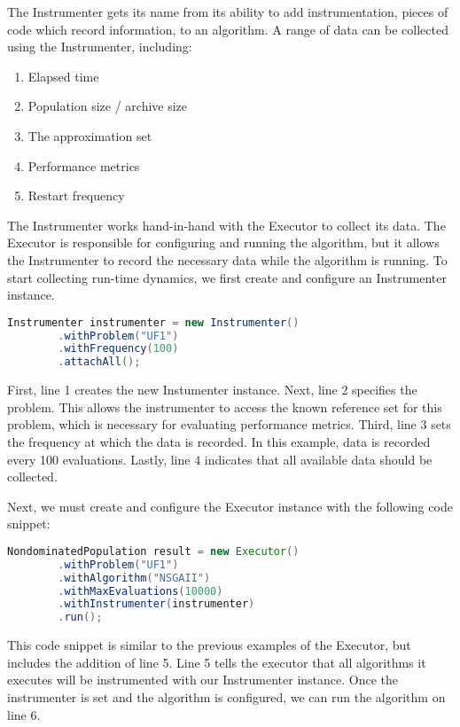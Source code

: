 The Instrumenter gets its name from its ability to add instrumentation, pieces of code which record information, to an algorithm.  A range of data can be collected using the Instrumenter, including:

\begin{enumerate}
  \item Elapsed time
  \item Population size / archive size
  \item The approximation set
  \item Performance metrics
  \item Restart frequency
\end{enumerate}

The Instrumenter works hand-in-hand with the Executor to collect its data.  The Executor is responsible for configuring and running the algorithm, but it allows the Instrumenter to record the necessary data while the algorithm is running.  To start collecting run-time dynamics, we first create and configure an Instrumenter instance.

\begin{lstlisting}[language=Java]
Instrumenter instrumenter = new Instrumenter()
		.withProblem("UF1")
		.withFrequency(100)
		.attachAll();
\end{lstlisting}

First, line 1 creates the new Instumenter instance.  Next, line 2 specifies the problem.  This allows the instrumenter to access the known reference set for this problem, which is necessary for evaluating performance metrics.  Third, line 3 sets the frequency at which the data is recorded.  In this example, data is recorded every 100 evaluations.  Lastly, line 4 indicates that all available data should be collected.

Next, we must create and configure the Executor instance with the following code snippet:

\begin{lstlisting}[language=Java]
NondominatedPopulation result = new Executor()
		.withProblem("UF1")
		.withAlgorithm("NSGAII")
		.withMaxEvaluations(10000)
		.withInstrumenter(instrumenter)
		.run();
\end{lstlisting}

This code snippet is similar to the previous examples of the Executor, but includes the addition of line 5.  Line 5 tells the executor that all algorithms it executes will be instrumented with our Instrumenter instance.  Once the instrumenter is set and the algorithm is configured, we can run the algorithm on line 6.

